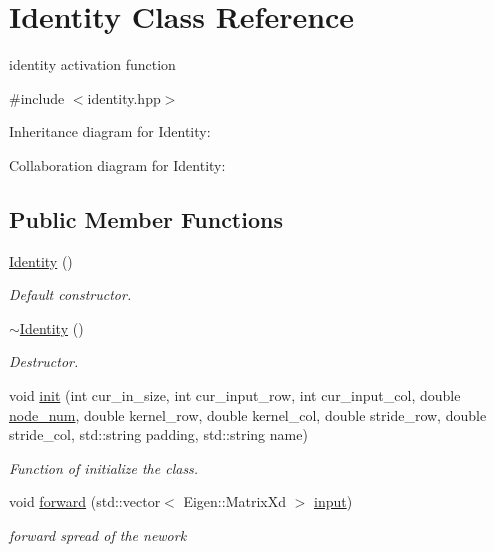 \hypertarget{class_identity}{}\section{Identity Class Reference}
\label{class_identity}


identity activation function  




{\ttfamily \#include $<$identity.\+hpp$>$}



Inheritance diagram for Identity\+:


Collaboration diagram for Identity\+:
\subsection*{Public Member Functions}
\begin{DoxyCompactItemize}
\item 
\hyperlink{class_identity_a160593ab7066d1ce0677a75bd4263d2f}{Identity} ()
\begin{DoxyCompactList}\small\item\em Default constructor. \end{DoxyCompactList}\item 
\hyperlink{class_identity_ae2d2f09e464b093543e398e42669088c}{$\sim$\+Identity} ()
\begin{DoxyCompactList}\small\item\em Destructor. \end{DoxyCompactList}\item 
void \hyperlink{class_identity_adcf6d70548e5f5d63d1919c79fb1bcce}{init} (int cur\+\_\+in\+\_\+size, int cur\+\_\+input\+\_\+row, int cur\+\_\+input\+\_\+col, double \hyperlink{class_layer_a2f19878482d098654fb084b9c21b72ed}{node\+\_\+num}, double kernel\+\_\+row, double kernel\+\_\+col, double stride\+\_\+row, double stride\+\_\+col, std\+::string padding, std\+::string name)
\begin{DoxyCompactList}\small\item\em Function of initialize the class. \end{DoxyCompactList}\item 
void \hyperlink{class_identity_af202a7a325b2db8939e00673877c6b2e}{forward} (std\+::vector$<$ Eigen\+::\+Matrix\+Xd $>$ \hyperlink{class_layer_a5213366d9a5a7317c5d40d9efdcfa623}{input})
\begin{DoxyCompactList}\small\item\em forward spread of the nework \end{DoxyCompactList}\end{DoxyCompactItemize}
